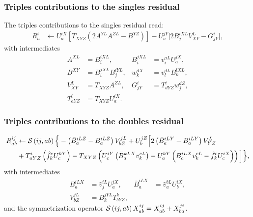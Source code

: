 \documentclass[a4paper,12pt,oneside]{book}
\newcommand{\sop}[1]{{\cal S}\left(#1\right)}
\begin{document}
\subsubsection{Triples contributions to the singles residual}

The triples contributions to the singles residual read:
\begin{equation}
\begin{aligned}
R_a^i &\leftarrow U_a^{iX} \left[T_{XYZ} \left(2A^{YL} A^{ZL} - B^{YZ}\right)\right]
- U_a^{jY} \Big[2 {B}_{j}^{iXL} V_{XY}^{L}- G_{jY}^{i}\Big],
\end{aligned}
\end{equation}
with intermediates
\begin{equation}
\begin{aligned}
A^{XL}&={B}_{i}^{iXL}, &{B}_{i}^{jXL} &= v_i^{aL} U_a^{jX},\\
B^{XY}&={B}_{i}^{jXL} {B}_{j}^{iYL}, 
&w_k^{dX} &= v_l^{dL} {B}_k^{lXL},\\
V_{XY}^{L} &= T_{XYZ} A^{ZL}, &G_{jY}^{i} &= T_{dYZ}^{i} w_j^{dZ},\\
T_{aYZ}^{i} &= T_{XYZ} U_a^{iX}. &
\end{aligned}
\end{equation}

\subsubsection{Triples contributions to the doubles residual}

\begin{equation}
\begin{aligned}
R_{ab}^{ij} &\leftarrow \sop{ij,ab} \Big\{ 
- \left(\bar B_a^{iLZ} - B_a^{iLZ}\right) V_{bZ}^{jL}
+U_b^{jZ} \Big[2\left(\bar B_a^{iLY} - B_a^{iLY}\right) V_{YZ}^{L} \\
& + T_{aYZ}^{i} \left(\hat{f}_k^c U_c^{kY}\right)
  - T_{XYZ} \left(U_c^{iY}\left(\bar B_a^{kLX} v_k^{cL}\right) 
- U_a^{kY} \left(B_c^{iLX} v_k^{cL} - \hat{f}_k^c U_c^{iX}\right)\right)\Big]
 \Big\},
\end{aligned}
\end{equation}
with intermediates
\begin{equation}
\begin{aligned}
B_a^{iLX} &= \hat{v}_j^{iL} U_a^{jX},  &\bar B_a^{iLX} &= \hat{v}_a^{bL} U_b^{iX},\\
V_{bZ}^{jL} &= {B}_k^{jYL} T_{bYZ}^{k}, &
\end{aligned}
\end{equation}
and the symmetrization operator $\sop{ij,ab}  X_{ab}^{ij} = X_{ab}^{ij} + X_{ba}^{ji}$.
\end{document}
